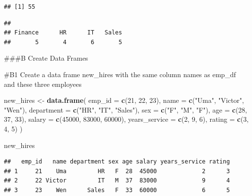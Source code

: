 \documentclass[
]{article}
\newenvironment{Shaded}{\begin{snugshade}}{\end{snugshade}}
\newcommand{\AttributeTok}[1]{\textcolor[rgb]{0.13,0.29,0.53}{#1}}
\newcommand{\DecValTok}[1]{\textcolor[rgb]{0.00,0.00,0.81}{#1}}
\newcommand{\FunctionTok}[1]{\textcolor[rgb]{0.13,0.29,0.53}{\textbf{#1}}}
\newcommand{\NormalTok}[1]{#1}
\newcommand{\OtherTok}[1]{\textcolor[rgb]{0.56,0.35,0.01}{#1}}
\newcommand{\SpecialCharTok}[1]{\textcolor[rgb]{0.81,0.36,0.00}{\textbf{#1}}}
\newcommand{\StringTok}[1]{\textcolor[rgb]{0.31,0.60,0.02}{#1}}
\begin{document}
\begin{verbatim}
## [1] 55
\end{verbatim}

\begin{Shaded}
\end{Shaded}

\begin{verbatim}
## 
## Finance      HR      IT   Sales 
##       5       4       6       5
\end{verbatim}

\#\#\#B Create Data Frames

\#B1 Create a data frame new\_hires with the same column names as
emp\_df and these three employees

\begin{Shaded}
\begin{Highlighting}[]
\NormalTok{new\_hires }\OtherTok{\textless{}{-}} \FunctionTok{data.frame}\NormalTok{(}
  \AttributeTok{emp\_id =} \FunctionTok{c}\NormalTok{(}\DecValTok{21}\NormalTok{, }\DecValTok{22}\NormalTok{, }\DecValTok{23}\NormalTok{),}
  \AttributeTok{name =} \FunctionTok{c}\NormalTok{(}\StringTok{"Uma"}\NormalTok{, }\StringTok{"Victor"}\NormalTok{, }\StringTok{"Wen"}\NormalTok{),}
  \AttributeTok{department =} \FunctionTok{c}\NormalTok{(}\StringTok{"HR"}\NormalTok{, }\StringTok{"IT"}\NormalTok{, }\StringTok{"Sales"}\NormalTok{),}
  \AttributeTok{sex =} \FunctionTok{c}\NormalTok{(}\StringTok{"F"}\NormalTok{, }\StringTok{"M"}\NormalTok{, }\StringTok{"F"}\NormalTok{),}
  \AttributeTok{age =} \FunctionTok{c}\NormalTok{(}\DecValTok{28}\NormalTok{, }\DecValTok{37}\NormalTok{, }\DecValTok{33}\NormalTok{),}
  \AttributeTok{salary =} \FunctionTok{c}\NormalTok{(}\DecValTok{45000}\NormalTok{, }\DecValTok{83000}\NormalTok{, }\DecValTok{60000}\NormalTok{),}
  \AttributeTok{years\_service =} \FunctionTok{c}\NormalTok{(}\DecValTok{2}\NormalTok{, }\DecValTok{9}\NormalTok{, }\DecValTok{6}\NormalTok{),}
  \AttributeTok{rating =} \FunctionTok{c}\NormalTok{(}\DecValTok{3}\NormalTok{, }\DecValTok{4}\NormalTok{, }\DecValTok{5}\NormalTok{)}
\NormalTok{)}


\NormalTok{new\_hires}
\end{Highlighting}
\end{Shaded}

\begin{verbatim}
##   emp_id   name department sex age salary years_service rating
## 1     21    Uma         HR   F  28  45000             2      3
## 2     22 Victor         IT   M  37  83000             9      4
## 3     23    Wen      Sales   F  33  60000             6      5
\end{verbatim}
\end{document}
